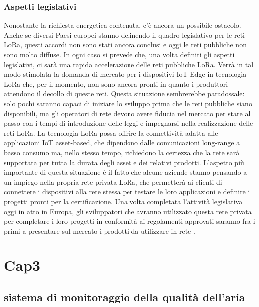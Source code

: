 \documentclass[a4paper]{report} %
\begin{document}
\subsection{Aspetti legislativi}
Nonostante la richiesta energetica contenuta, c'è ancora un possibile ostacolo. Anche se diversi Paesi europei stanno definendo il quadro legislativo per le reti LoRa, questi accordi non sono stati ancora conclusi e oggi le reti pubbliche non sono molto diffuse. In ogni caso si prevede che, una volta definiti gli aspetti legislativi, ci sarà una rapida accelerazione delle reti pubbliche LoRa. Verrà in tal modo stimolata la domanda di mercato per i dispositivi IoT Edge in tecnologia LoRa che, per il momento, non sono ancora pronti in quanto i produttori attendono il decollo di queste reti. Questa situazione sembrerebbe paradossale: solo pochi saranno capaci di iniziare lo sviluppo prima che le reti pubbliche siano disponibili, ma gli operatori di rete devono avere fiducia nel mercato per stare al passo con i tempi di introduzione delle leggi e impegnarsi nella realizzazione delle reti LoRa. La tecnologia LoRa possa offrire la connettività adatta alle applicazioni IoT asset-based, che dipendono dalle comunicazioni long-range a basso consumo ma, nello stesso tempo, richiedono la certezza che la rete sarà supportata per tutta la durata degli asset e dei relativi prodotti. L'aspetto più importante di questa situazione è il fatto che alcune aziende stanno pensando a un impiego nella propria rete privata LoRa, che permetterà ai clienti di connettere i dispositivi alla rete stessa per testare le loro applicazioni e definire i progetti pronti per la certificazione. Una volta completata l'attività legislativa oggi in atto in Europa, gli sviluppatori che avranno utilizzato questa rete privata per completare i loro progetti in conformità ai regolamenti approvati saranno fra i primi a presentare sul mercato i prodotti da utilizzare in rete \cite{art:rif.20}.

\chapter{Cap3}
\section{sistema di monitoraggio della qualità dell'aria}
\end{document}
